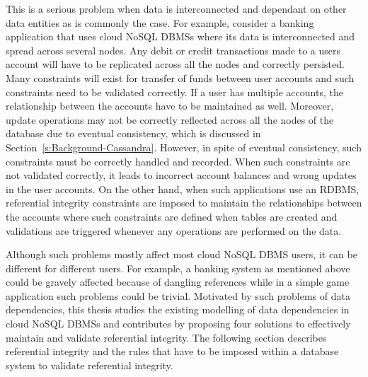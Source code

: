 This is a serious problem when data is interconnected and dependant on other
data entities as is commonly the case.  For example,   consider a banking
application that uses cloud \ac{NoSQL} \acp{DBMS} where its data is
interconnected and spread across several nodes.  Any debit or credit
transactions made to a users account will have to be replicated across all the
nodes and correctly persisted.  Many constraints will exist for transfer of
funds between user accounts and such constraints need to be validated correctly.
 If a user has multiple accounts,   the relationship between the accounts have
to be maintained as well. Moreover, update operations may not be correctly
reflected across all the nodes of the database due to eventual consistency, 
 which is discussed in Section~\ref{s:Background-Cassandra}.
However, in spite of eventual consistency,   such constraints must be
correctly handled and recorded. When such constraints are not validated
correctly,   it leads to incorrect account balances and wrong updates in the
user accounts.  On the other hand,   when such applications use an \ac{RDBMS},  
referential integrity constraints are imposed to maintain the relationships
between the accounts where such constraints are defined when tables are created
and validations are triggered whenever any operations are performed on the data.

Although such problems mostly affect most cloud \ac{NoSQL} \ac{DBMS} users,   it
can be different for different users.  For example, a banking system as
mentioned above could be gravely affected because of dangling references while
in a simple game application such problems could be trivial.
Motivated by such problems of data dependencies, this thesis studies the
existing modelling of data dependencies in cloud \ac{NoSQL} \acp{DBMS} and
contributes by proposing four solutions to effectively maintain and validate
referential integrity.
The following section describes referential integrity and the rules that have to
be imposed within a database system to validate referential integrity.
